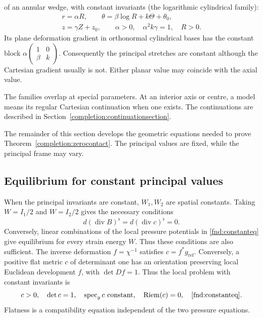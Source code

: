 \documentclass[11pt,a4paper]{article}
\numberwithin{equation}{section}
\theoremstyle{plain}
\theoremstyle{definition}
\theoremstyle{remark}
\begin{document}
\begin{description}
of an annular wedge, with constant invariants (the logarithmic cylindrical family):
\begin{equation}\label{intro:family5}
 \begin{gathered}
 r=\alpha R,\qquad \theta=\beta\log R+k\Theta+\theta_0,\\
 z=\gamma Z+z_0,\qquad
 \alpha>0,\quad \alpha^2k\gamma=1,\quad R>0.
 \end{gathered}
\end{equation}
Its plane deformation gradient in orthonormal cylindrical bases has the
constant block $\alpha\left(\begin{smallmatrix}1&0\\\beta&k\end{smallmatrix}\right)$.
Consequently the principal stretches are constant although the Cartesian
gradient usually is not. Either planar value may coincide with the axial value.
\end{description}

The families overlap at special parameters. At an interior axis or
centre, a model means its regular Cartesian continuation when one exists.
The continuations are described in Section~\ref{completion:continuationsection}.

The remainder of this section develops the geometric equations
needed to prove Theorem~\ref{completion:zerocontact}. The principal
values are fixed, while the principal frame may vary.

\subsection{Equilibrium for constant principal values}
When the principal invariants are constant, $W_1,W_2$ are spatial
constants. Taking $W=I_1/2$ and $W=I_2/2$ gives the necessary conditions
\begin{equation}\label{fnd:constanteq}
d(\operatorname{div}B)^\flat=d(\operatorname{div}c)^\flat=0.
\end{equation}
Conversely, linear combinations of the local pressure potentials in
\eqref{fnd:constanteq} give equilibrium for every strain energy $W$. Thus
these conditions are also sufficient.
The inverse deformation $f=\chi^{-1}$ satisfies $c=f^*g_{\mathrm{ref}}$. Conversely, a positive flat metric $c$ of determinant one has an orientation preserving local Euclidean development $f$, with $\det Df=1$. Thus the local problem with constant invariants is
\begin{equation}\label{fnd:twometric}
c>0,\quad \det c=1,\quad \operatorname{spec}_g c\text{ constant},\quad
\operatorname{Riem}(c)=0,\quad \eqref{fnd:constanteq}.
\end{equation}
Flatness is a compatibility equation independent of the two pressure equations.
\end{document}
